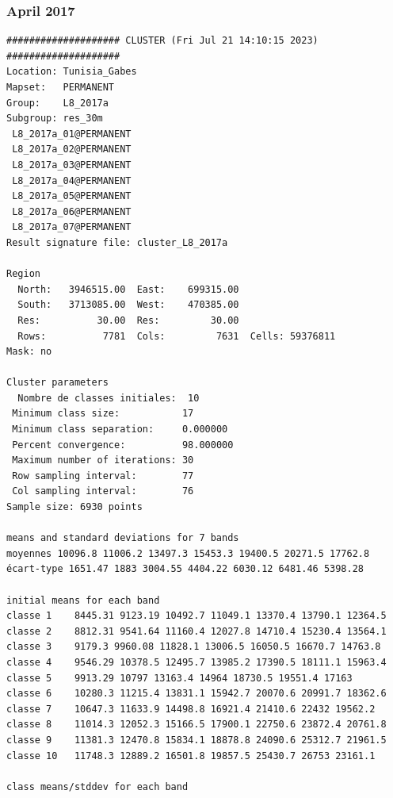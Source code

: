 \documentclass[land,article,submit,pdftex,moreauthors]{Definitions/mdpi}
\begin{document}
\subsubsection[\appendixname~\thesubsubsection]{April 2017}
\begin{scriptsize}
\begin{verbatim}
#################### CLUSTER (Fri Jul 21 14:10:15 2023) ####################
Location: Tunisia_Gabes
Mapset:   PERMANENT
Group:    L8_2017a
Subgroup: res_30m
 L8_2017a_01@PERMANENT
 L8_2017a_02@PERMANENT
 L8_2017a_03@PERMANENT
 L8_2017a_04@PERMANENT
 L8_2017a_05@PERMANENT
 L8_2017a_06@PERMANENT
 L8_2017a_07@PERMANENT
Result signature file: cluster_L8_2017a

Region
  North:   3946515.00  East:    699315.00
  South:   3713085.00  West:    470385.00
  Res:          30.00  Res:         30.00
  Rows:          7781  Cols:         7631  Cells: 59376811
Mask: no

Cluster parameters
  Nombre de classes initiales: 	10
 Minimum class size:           17
 Minimum class separation:     0.000000
 Percent convergence:          98.000000
 Maximum number of iterations: 30
 Row sampling interval:        77
 Col sampling interval:        76
Sample size: 6930 points

means and standard deviations for 7 bands
moyennes 10096.8 11006.2 13497.3 15453.3 19400.5 20271.5 17762.8
écart-type 1651.47 1883 3004.55 4404.22 6030.12 6481.46 5398.28

initial means for each band
classe 1    8445.31 9123.19 10492.7 11049.1 13370.4 13790.1 12364.5
classe 2    8812.31 9541.64 11160.4 12027.8 14710.4 15230.4 13564.1
classe 3    9179.3 9960.08 11828.1 13006.5 16050.5 16670.7 14763.8
classe 4    9546.29 10378.5 12495.7 13985.2 17390.5 18111.1 15963.4
classe 5    9913.29 10797 13163.4 14964 18730.5 19551.4 17163
classe 6    10280.3 11215.4 13831.1 15942.7 20070.6 20991.7 18362.6
classe 7    10647.3 11633.9 14498.8 16921.4 21410.6 22432 19562.2
classe 8    11014.3 12052.3 15166.5 17900.1 22750.6 23872.4 20761.8
classe 9    11381.3 12470.8 15834.1 18878.8 24090.6 25312.7 21961.5
classe 10   11748.3 12889.2 16501.8 19857.5 25430.7 26753 23161.1

class means/stddev for each band


\end{verbatim}
\end{scriptsize}
\end{document}
